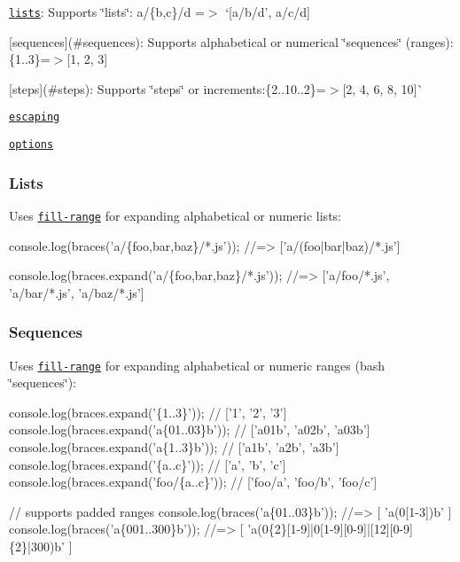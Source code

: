 \begin{DoxyItemize}
\item \href{#lists}{\tt lists}\+: Supports \char`\"{}lists\char`\"{}\+: {\ttfamily a/\{b,c\}/d} =$>$ `\mbox{[}\textquotesingle{}a/b/d', \textquotesingle{}a/c/d\textquotesingle{}\mbox{]}{\ttfamily }
\item {\ttfamily \mbox{[}sequences\mbox{]}(\#sequences)\+: Supports alphabetical or numerical \char`\"{}sequences\char`\"{} (ranges)\+:}\{1..3\}{\ttfamily =$>$}\mbox{[}\textquotesingle{}1\textquotesingle{}, \textquotesingle{}2\textquotesingle{}, \textquotesingle{}3\textquotesingle{}\mbox{]}{\ttfamily }
\item {\ttfamily \mbox{[}steps\mbox{]}(\#steps)\+: Supports \char`\"{}steps\char`\"{} or increments\+:}\{2..10..2\}{\ttfamily =$>$}\mbox{[}\textquotesingle{}2\textquotesingle{}, \textquotesingle{}4\textquotesingle{}, \textquotesingle{}6\textquotesingle{}, \textquotesingle{}8\textquotesingle{}, \textquotesingle{}10\textquotesingle{}\mbox{]}\`{}
\item \href{#escaping}{\tt escaping}
\item \href{#options}{\tt options}
\end{DoxyItemize}

\subsubsection*{Lists}

Uses \href{https://github.com/jonschlinkert/fill-range}{\tt fill-\/range} for expanding alphabetical or numeric lists\+:


\begin{DoxyCode}
console.log(braces('a/\{foo,bar,baz\}/*.js'));
//=> ['a/(foo|bar|baz)/*.js']

console.log(braces.expand('a/\{foo,bar,baz\}/*.js'));
//=> ['a/foo/*.js', 'a/bar/*.js', 'a/baz/*.js']
\end{DoxyCode}


\subsubsection*{Sequences}

Uses \href{https://github.com/jonschlinkert/fill-range}{\tt fill-\/range} for expanding alphabetical or numeric ranges (bash \char`\"{}sequences\char`\"{})\+:


\begin{DoxyCode}
console.log(braces.expand('\{1..3\}'));     // ['1', '2', '3']
console.log(braces.expand('a\{01..03\}b')); // ['a01b', 'a02b', 'a03b']
console.log(braces.expand('a\{1..3\}b'));   // ['a1b', 'a2b', 'a3b']
console.log(braces.expand('\{a..c\}'));     // ['a', 'b', 'c']
console.log(braces.expand('foo/\{a..c\}')); // ['foo/a', 'foo/b', 'foo/c']

// supports padded ranges
console.log(braces('a\{01..03\}b'));   //=> [ 'a(0[1-3])b' ]
console.log(braces('a\{001..300\}b')); //=> [ 'a(0\{2\}[1-9]|0[1-9][0-9]|[12][0-9]\{2\}|300)b' ]
\end{DoxyCode}


